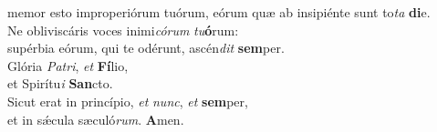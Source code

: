 \oddverse memor esto improperiórum tuórum, eórum quæ ab insipiénte sunt to\textit{ta} \textbf{di}e.\\
\evenverse Ne obliviscáris voces inimi\textit{có}\textit{rum} \textit{tu}\textbf{ó}rum:~\*\\
\evenverse supérbia eórum, qui te odérunt, ascén\textit{dit} \textbf{sem}per.\\
\oddverse Glória \textit{Pa}\textit{tri}, \textit{et} \textbf{Fí}lio,~\*\\
\oddverse et Spirítu\textit{i} \textbf{San}cto.\\
\evenverse Sicut erat in princípio, \textit{et} \textit{nunc}, \textit{et} \textbf{sem}per,~\*\\
\evenverse et in sǽcula sæculó\textit{rum}. \textbf{A}men.\\
